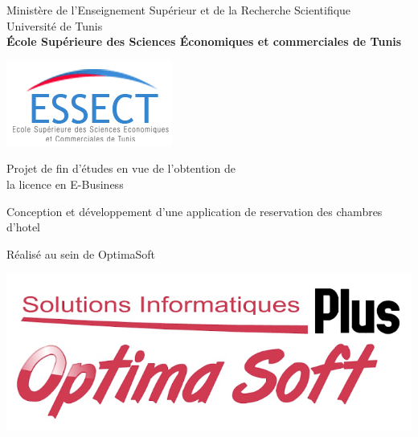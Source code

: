 \documentclass{report}
\begin{document}
\begin{minipage}{\textwidth}
\centering

\vspace{-30px}

\textnormal{\fontsize{12px}{12px}\selectfont
    Minist\`ere de l'Enseignement Supérieur et de la Recherche Scientifique\\
\vspace{3px}
Université de Tunis\\
}
\vspace{10px}
\textbf{\fontsize{12px}{12px}\selectfont
    École Supérieure des Sciences  Économiques et commerciales de Tunis
}

\vspace{15px}

\begin{center}
\includegraphics[scale=0.8]{images/essect.png}
\end{center}

\vspace{20px}
\begin{center}
\textnormal{\Large\selectfont
   Projet de fin d'études en vue de l'obtention de \\ 
\vspace{7px}
la licence en E-Business
}
\end{center}

\vspace{10px}
\begin{boxB}
\begin{center}
Conception et développement d'une application de reservation des chambres d'hotel
\end{center}
\end{boxB}

\vspace{50px}
\textnormal{\Large Réalisé au sein de OptimaSoft }
\vspace{5px}
\begin{center}
\includegraphics[scale=0.2]{images/optima.png}
\end{center}


\end{minipage}
\end{document}
